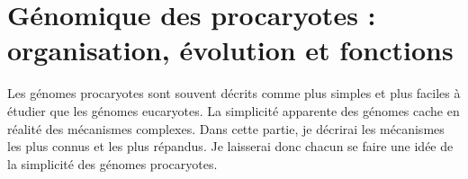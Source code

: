 \chapter{Génomique des procaryotes : organisation, évolution et fonctions}


Les génomes procaryotes sont souvent décrits comme plus simples et plus faciles à étudier que les génomes eucaryotes. La simplicité apparente des génomes cache en réalité des mécanismes complexes. Dans cette partie, je décrirai les mécanismes les plus connus et les plus répandus. Je laisserai donc chacun se faire une idée de la simplicité des génomes procaryotes.





